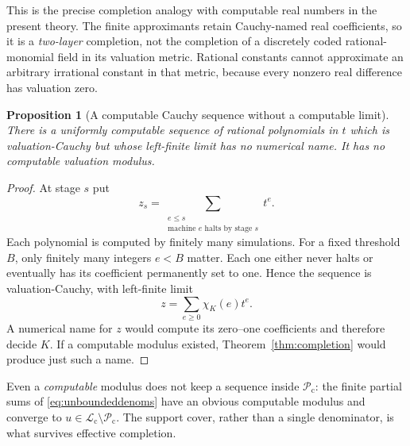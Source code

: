 \documentclass[11pt,letterpaper]{article}
\numberwithin{equation}{section}
\newtheorem{proposition}[theorem]{Proposition}
\theoremstyle{definition}
\theoremstyle{remark}
\newcommand{\Lc}{\mathcal L_{\mathrm c}}
\newcommand{\Pc}{\mathcal P_{\mathrm c}}
\begin{document}
This is the precise completion analogy with computable real numbers in the
present theory. The finite approximants retain Cauchy-named real
coefficients, so it is a \emph{two-layer} completion, not the completion of
a discretely coded rational-monomial field in its valuation metric.
Rational constants cannot approximate an arbitrary irrational constant in
that metric, because every nonzero real difference has valuation zero.

\begin{proposition}[A computable Cauchy sequence without a computable limit]
\label{prop:nonmodulus}
There is a uniformly computable sequence of rational polynomials in $t$
which is valuation-Cauchy but whose left-finite limit has no numerical name.
It has no computable valuation modulus.
\end{proposition}
\begin{proof}
At stage $s$ put
\[
 z_s=\sum_{\substack{e\le s\\\text{machine }e\text{ halts by stage }s}}t^e.
\]
Each polynomial is computed by finitely many simulations. For a fixed
threshold $B$, only finitely many integers $e<B$ matter. Each one either
never halts or eventually has its coefficient permanently set to one.
Hence the sequence is valuation-Cauchy, with left-finite limit
\[
 z=\sum_{e\ge0}\chi_K(e)t^e.
\]
A numerical name for $z$ would compute its zero--one coefficients and
therefore decide $K$. If a computable modulus existed,
Theorem~\ref{thm:completion} would produce just such a name.
\end{proof}

Even a \emph{computable} modulus does not keep a sequence inside $\Pc$:
the finite partial sums of \eqref{eq:unboundeddenoms} have an obvious
computable modulus and converge to $u\in\Lc\setminus\Pc$. The support
cover, rather than a single denominator, is what survives effective
completion.
\end{document}
